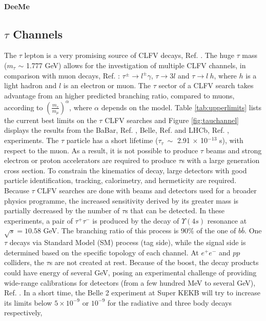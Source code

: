 \paragraph{DeeMe}
\cite{dukes}
\subsection{$\tau$ Channels}
The $\tau$ lepton is a very promising source of CLFV decays, Ref. \cite{universe8060299}. 
The huge $\tau$ mass ($m_\tau$ $\sim$ 1.777 GeV) allows for the investigation of multiple CLFV channels, in comparison with muon decays, Ref. \cite{clfv_signorelli}: 
$\tau^\pm \rightarrow l^\pm \gamma$, $\tau \rightarrow 3l$ and $\tau\rightarrow l \ h$, 
where $h$ is a light hadron and $l$ is an electron or muon. The $\tau$ sector of a CLFV search takes advantage from an higher predicted branching ratio, compared to muons, 
according to $(\frac{m_\tau}{m_\mu})^\alpha$, where $\alpha$ depends on the model. Table \ref{tab:upperlimits} lists the current best limits on the $\tau$ 
CLFV searches and Figure \ref{fig:tauchannel} displays the results from the BaBar, Ref. \cite{PhysRevD.77.091104}, Belle, Ref. \cite{ABASHIAN2002117} and LHCb, 
Ref. \cite{TheLHCbCollaboration2008}, experiments. The $\tau$ particle has a short lifetime ($\tau_\tau \ \sim$ 2.91 $\times$ 10$^{-13}$ s), with respect to the muon.
As a result, it is not possible to produce $\tau$ beams and strong electron or proton accelerators are required to produce $\tau$s with a large generation cross section. 
To constrain the kinematics of decay, large detectors with good particle identification, tracking, calorimetry, and hermeticity are required. 
Because $\tau$ CLFV searches are done with beams and detectors used for a broader physics programme, 
the increased sensitivity derived by its greater mass is partially decreased by the number of $\tau$s that can be detected.
In these experiments, a pair of $\tau^+ \tau^-$ is produced by the decay of $\Upsilon(4s)$ resonance at $\sqrt{s}=10.58$ GeV. The branching ratio of this process is  $90\%$ of 
the one of $b \bar{b}$. One $\tau$ decays via Standard Model (SM) process (tag side), while the signal side is determined based on the specific topology of each channel. 
At $e^+ e^-$ and $pp$ colliders, the $\tau$s are not created at rest. Because of the boost, the decay products could have 
energy of several GeV, posing an experimental challenge of providing wide-range calibrations for detectors (from a few hundred MeV to several GeV), Ref. \cite{universe8060299}.
In a short time, the Belle 2 experiment at Super KEKB will try to increase its limits below $5 \times 10^{-9}$ or $10^{-9}$ for the radiative and three body decays respectively, 
